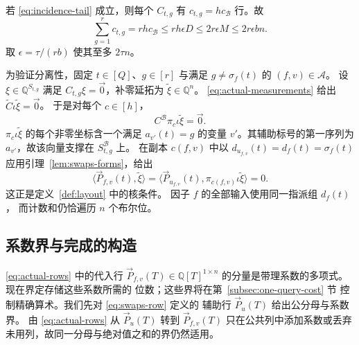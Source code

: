 若 \eqref{eq:incidence-tail} 成立，则每个 $C_{t,g}$
有 $c_{t,g}=hc_{\mathcal B}$ 行。故
\begin{equation}\label{eq:incidence-measurement-count}
 \sum_{g=1}^r c_{t,g}=rh c_{\mathcal B}
 \le rh\epsilon D\le2r\epsilon M\le2r\epsilon bn.
\end{equation}
取 $\epsilon=\tau/(rb)$ 使其至多 $2\tau n$。

为验证分离性，固定 $t\in[Q]$、$g\in[r]$ 与满足
$g\ne\sigma_f(t)$ 的 $(f,v)\in\mathcal A$。
设 $\xi\in\mathbb Q^{S_{t,g}}$ 满足
$C_{t,g}\xi=\vec{0}$，补零延拓为
$\widetilde\xi\in\mathbb Q^n$。
\eqref{eq:actual-measurements} 给出
$\widetilde C\iota\widetilde\xi=\vec{0}$。
于是对每个 $c\in[h]$，
\[
 C^{\mathcal B}\pi_c\iota\widetilde\xi=\vec{0}.
\]
$\pi_c\iota\widetilde\xi$ 的每个非零坐标含一个满足
$a_{v'}(t)=g$ 的变量 $v'$。其辅助标号的第一序列为
$a_{v'}$，故该向量支撑在 $S^{\mathcal B}_{t,g}$ 上。
在副本 $c(f,v)$ 中以 $d_{u_{f,v}}(t)=d_f(t)=\sigma_f(t)$
应用引理~\ref{lem:swaps-forms}，给出
\[
 \langle \vec{P}_{f,v}(t), \widetilde\xi\rangle
 =\langle \vec{P}_{u_{f,v}}(t), \pi_{c(f,v)}\iota\widetilde\xi\rangle=0.
\]
这正是定义~\ref{def:layout} 中的核条件。
因子 $f$ 的全部输入使用同一指派组 $d_f(t)$，
而计数和仍恰遍历 $n$ 个布尔位。

\subsection{系数界与完成的构造}
\eqref{eq:actual-rows} 中的代入行
$\vec{P}_{f,v}(T)\in\mathbb Q[T]^{1\times n}$
的分量是带理系数的多项式。现在界定存储这些系数所需的
位数；这些界将在第~\ref{subsec:one-query-cost} 节
控制精确算术。我们先对 \eqref{eq:swaps-row} 定义的
辅助行 $\vec{P}_u(T)$ 给出公分母与系数界。
由 \eqref{eq:actual-rows} 从 $\vec{P}_u(T)$
转到 $\vec{P}_{f,v}(T)$ 只在公共列中添加系数或丢弃
未用列，故同一分母与绝对值之和的界仍然适用。

